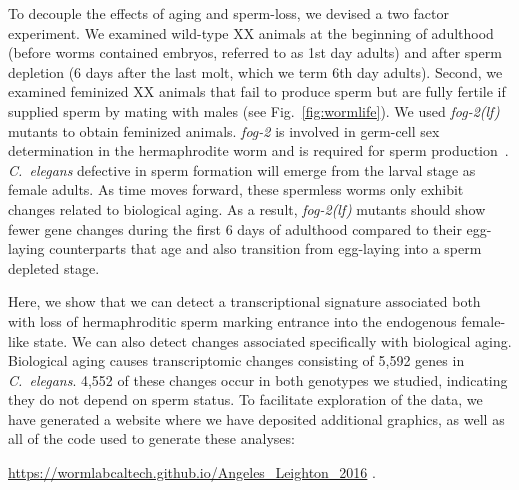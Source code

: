 \documentclass[9pt,twocolumn,twoside]{gsag3jnl}
\newcommand{\cel}{\emph{C.~elegans}}
\newcommand{\fog}{\emph{\mbox{fog-2(lf)}}}
\newcommand{\gene}[1]{\emph{\mbox{#1}}}
\newcommand{\agen}{5,592}
\newcommand{\website}{
            \url{https://wormlabcaltech.github.io/Angeles_Leighton_2016}
            }
\begin{document}
To decouple the effects of aging and sperm-loss, we devised a two factor
experiment. We examined wild-type XX animals at the beginning of adulthood
(before worms contained embryos, referred to as 1st day adults) and after sperm
depletion (6 days after the last molt, which we term 6th day adults). Second, we
examined feminized XX animals that fail to produce sperm but are fully fertile
if supplied sperm by mating with males (see Fig.~\ref{fig:wormlife}). We used
\fog{} mutants to obtain feminized animals. \gene{fog-2} is involved in
germ-cell sex determination in the hermaphrodite worm and is required for sperm
production~\citep{Schedl1988,Clifford2000}. \cel{} defective in sperm formation
will emerge from the larval stage as female adults. As time moves forward, these
spermless worms only exhibit changes related to biological aging. As a result,
\fog{} mutants should show fewer gene changes during the first 6 days of
adulthood compared to their egg-laying counterparts that age and also transition
from egg-laying into a sperm depleted stage.


Here, we show that we can detect a transcriptional signature associated both
with loss of hermaphroditic sperm marking entrance into the endogenous
female-like state. We can also detect changes associated specifically with
biological aging. Biological aging causes transcriptomic changes consisting of
\agen{} genes in \cel{}. 4,552 of these changes occur in both genotypes we
studied, indicating they do not depend on sperm status. To facilitate
exploration of the data, we have generated a website where we have deposited
additional graphics, as well as all of the code used to generate these analyses:
\website{}.
\end{document}
